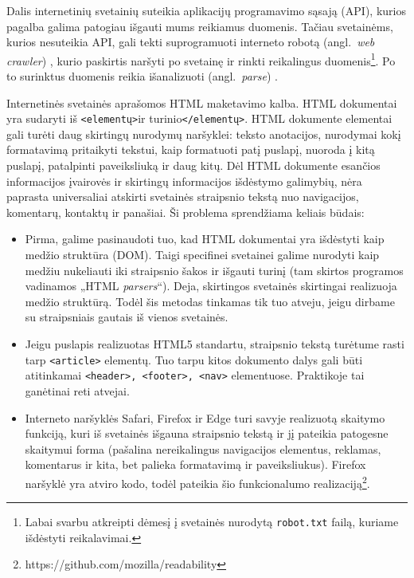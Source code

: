 \documentclass{VUMIFInfKursinis}
\newcommand{\ltang}[2]{#1 (angl.\  \textit{#2}) }
\begin{document}
Dalis internetinių svetainių suteikia aplikacijų programavimo sąsają
(API), kurios pagalba galima patogiau išgauti mums reikiamus duomenis.
Tačiau svetainėms, kurios nesuteikia API, gali tekti suprogramuoti
\ltang{interneto robotą}{web crawler}, kurio paskirtis naršyti po
svetainę ir rinkti reikalingus duomenis\footnote{Labai svarbu atkreipti
  dėmesį į svetainės nurodytą \texttt{robot.txt} failą, kuriame išdėstyti
  reikalavimai.}. Po to surinktus duomenis reikia \ltang{išanalizuoti}{parse}.

Internetinės svetainės aprašomos HTML maketavimo kalba. HTML dokumentai
yra sudaryti iš \texttt{\textless{}elementų\textgreater{}}ir
turinio\texttt{\textless{}/elementų\textgreater{}}. HTML dokumente
elementai gali turėti daug skirtingų nurodymų naršyklei: teksto
anotacijos, nurodymai kokį formatavimą pritaikyti tekstui, kaip
formatuoti patį puslapį, nuoroda į kitą puslapį, patalpinti paveiksliuką
ir daug kitų. Dėl HTML dokumente esančios informacijos įvairovės ir
skirtingų informacijos išdėstymo galimybių, nėra paprasta universaliai
atskirti svetainės straipsnio tekstą nuo navigacijos, komentarų,
kontaktų ir panašiai. Ši problema sprendžiama keliais būdais:

\begin{itemize}
\item
  Pirma, galime pasinaudoti tuo, kad HTML dokumentai yra išdėstyti kaip
  medžio struktūra (DOM). Taigi specifinei svetainei galime nurodyti
  kaip medžiu nukeliauti iki straipsnio šakos ir išgauti turinį (tam
  skirtos programos vadinamos „HTML \textit{parsers}“). Deja, skirtingos
  svetainės skirtingai realizuoja medžio struktūrą. Todėl šis metodas
  tinkamas tik tuo atveju, jeigu dirbame su straipsniais gautais iš
  vienos svetainės.
\item
  Jeigu puslapis realizuotas HTML5 standartu, straipsnio tekstą turėtume
  rasti tarp \texttt{\textless{}article\textgreater{}} elementų. Tuo tarpu
  kitos dokumento dalys gali būti atitinkamai
  \texttt{\textless{}header\textgreater{},
  \textless{}footer\textgreater{}, \textless{}nav\textgreater{}}
  elementuose. Praktikoje tai ganėtinai reti atvejai.
\item
  Interneto naršyklės Safari, Firefox ir Edge turi savyje realizuotą
  skaitymo funkciją, kuri iš svetainės išgauna straipsnio tekstą ir jį
  pateikia patogesne skaitymui forma (pašalina nereikalingus navigacijos
  elementus, reklamas, komentarus ir kita, bet palieka formatavimą ir
  paveiksliukus). Firefox naršyklė yra atviro kodo, todėl pateikia šio
  funkcionalumo realizaciją\footnote{https://github.com/mozilla/readability}.
\end{itemize}
\end{document}
